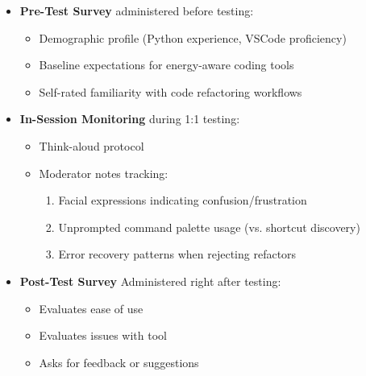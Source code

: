 \documentclass{article}
\begin{document}
\begin{itemize}
    \item \textbf{Pre-Test Survey} administered before testing:
    \begin{itemize}
        \item Demographic profile (Python experience, VSCode proficiency)
        \item Baseline expectations for energy-aware coding tools
        \item Self-rated familiarity with code refactoring workflows
    \end{itemize}
    
    \item \textbf{In-Session Monitoring} during 1:1 testing:
    \begin{itemize}
        \item Think-aloud protocol
        \item Moderator notes tracking:
        \begin{enumerate}
            \item Facial expressions indicating confusion/frustration
            \item Unprompted command palette usage (vs. shortcut discovery)
            \item Error recovery patterns when rejecting refactors
        \end{enumerate}
    \end{itemize}
    
    \item \textbf{Post-Test Survey} Administered right after testing:
    \begin{itemize}
        \item Evaluates ease of use
        \item Evaluates issues with tool
        \item Asks for feedback or suggestions
    \end{itemize}

\end{itemize}
\end{document}
